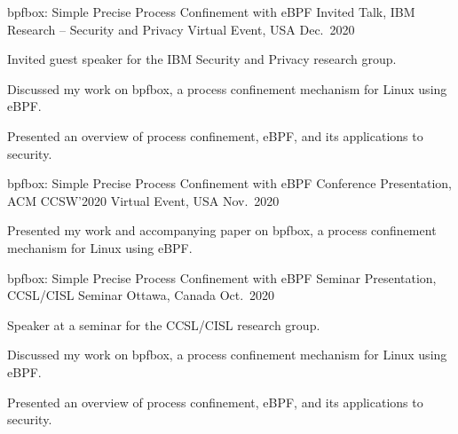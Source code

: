 

\begin{cventries}

  \cventry
    {bpfbox: Simple Precise Process Confinement with eBPF} %
    {Invited Talk, IBM Research -- Security and Privacy} %
    {Virtual Event, USA} %
    {Dec.~2020} %
    {
      \begin{cvitems} %
        \item Invited guest speaker for the IBM Security and Privacy research group.
        \item Discussed my work on bpfbox, a process confinement mechanism for Linux using eBPF.
        \item Presented an overview of process confinement, eBPF, and its applications to security.
      \end{cvitems}
    }

  \cventry
    {bpfbox: Simple Precise Process Confinement with eBPF} %
    {Conference Presentation, ACM CCSW'2020} %
    {Virtual Event, USA} %
    {Nov.~2020} %
    {
      \begin{cvitems} %
        \item Presented my work and accompanying paper on bpfbox, a process confinement mechanism for Linux using eBPF.
      \end{cvitems}
    }

  \cventry
    {bpfbox: Simple Precise Process Confinement with eBPF} %
    {Seminar Presentation, CCSL/CISL Seminar} %
    {Ottawa, Canada} %
    {Oct.~2020} %
    {
      \begin{cvitems} %
        \item Speaker at a seminar for the CCSL/CISL research group.
        \item Discussed my work on bpfbox, a process confinement mechanism for Linux using eBPF.
        \item Presented an overview of process confinement, eBPF, and its applications to security.
      \end{cvitems}
    }


\end{cventries}
